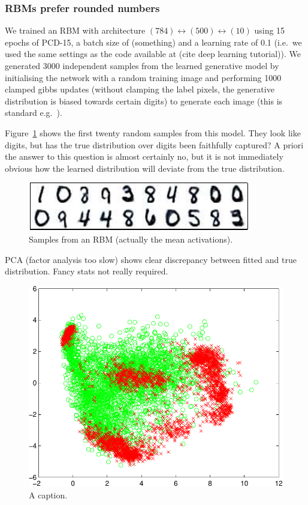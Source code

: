 \documentclass{article} %
\def\ie{i.e.\ }
\def\eg{e.g.\ }
\begin{document}
\subsubsection{RBMs prefer rounded numbers}

We trained an RBM with architecture $(784)\leftrightarrow(500)\leftrightarrow(10)$ using 15 epochs of PCD-15, a batch size of (something) and a learning rate of 0.1 (\ie we used the same settings as the code available at (cite deep learning tutorial)).
We generated 3000 independent samples from the learned generative model by initialising the network with a random training image and performing 1000 clamped gibbs updates (without clamping the label pixels, the generative distribution is biased towards certain digits) to generate each image (this is standard \eg \cite{Hinton2007}).

Figure~\ref{fig:rbm_samples} shows the first twenty random samples from this model.
They look like digits, but has the true distribution over digits been faithfully captured?
A priori the answer to this question is almost certainly no, but it is not immediately obvious how the learned distribution will deviate from the true distribution.

\begin{figure}[ht]
\centering
\includegraphics[width=0.98\columnwidth]{figures/rbm_samples}
\caption{
Samples from an RBM (actually the mean activations).
}
\label{fig:rbm_samples}
\end{figure}

PCA (factor analysis too slow) shows clear discrepancy between fitted and true distribution.
Fancy stats not really required.

\begin{figure}[ht]
\centering
\includegraphics[width=0.98\columnwidth]{figures/rbm_pca}
\caption{
A caption.
}
\label{fig:rbm_pca}
\end{figure}
\end{document}
